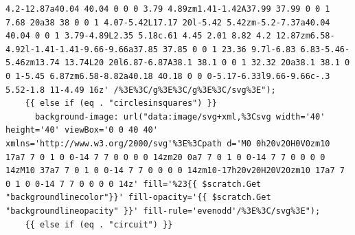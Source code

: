 \documentclass[11pt]{article}
\begin{document}
\begin{enumerate}
\begin{verbatim}
4.2-12.87a40.04 40.04 0 0 0 3.79 4.89zm1.41-1.42A37.99 37.99 0 0 1 7.68 20a38 38 0 0 1 4.07-5.42L17.17 20l-5.42 5.42zm-5.2-7.37a40.04 40.04 0 0 1 3.79-4.89L2.35 5.18c.61 4.45 2.01 8.82 4.2 12.87zm6.58-4.92l-1.41-1.41-9.66-9.66a37.85 37.85 0 0 1 23.36 9.7l-6.83 6.83-5.46-5.46zm13.74 13.74L20 20l6.87-6.87A38.1 38.1 0 0 1 32.32 20a38.1 38.1 0 0 1-5.45 6.87zm6.58-8.82a40.18 40.18 0 0 0-5.17-6.33l9.66-9.66c-.3 5.52-1.8 11-4.49 16z' /%3E%3C/g%3E%3C/g%3E%3C/svg%3E");
    {{ else if (eq . "circlesinsquares") }}
      background-image: url("data:image/svg+xml,%3Csvg width='40' height='40' viewBox='0 0 40 40' xmlns='http://www.w3.org/2000/svg'%3E%3Cpath d='M0 0h20v20H0V0zm10 17a7 7 0 1 0 0-14 7 7 0 0 0 0 14zm20 0a7 7 0 1 0 0-14 7 7 0 0 0 0 14zM10 37a7 7 0 1 0 0-14 7 7 0 0 0 0 14zm10-17h20v20H20V20zm10 17a7 7 0 1 0 0-14 7 7 0 0 0 0 14z' fill='%23{{ $scratch.Get "backgroundlinecolor"}}' fill-opacity='{{ $scratch.Get "backgroundlineopacity" }}' fill-rule='evenodd'/%3E%3C/svg%3E");
    {{ else if (eq . "circuit") }}

\end{verbatim}
\end{enumerate}
\end{document}
